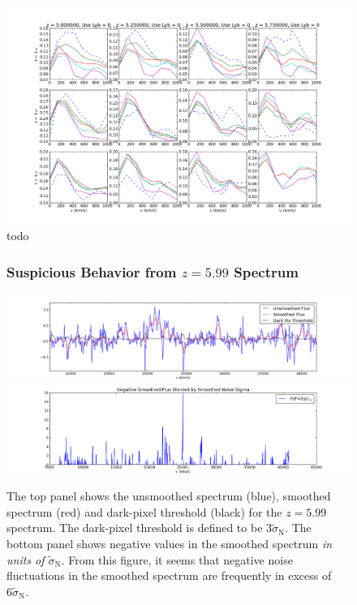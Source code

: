 \documentclass[11pt]{article}
\begin{document}
\begin{figure}[h]
  \centering
  \includegraphics[width=18cm]{gridPlot_CommonRes_AllSpectra.png}
  \caption{todo}
  \label{fig:todo}
\end{figure}

\begin{figure}[h]
\subsubsection*{Suspicious Behavior from $z = 5.99$ Spectrum}
  \centering
  \includegraphics[width=18cm]{z599_Spectra.png}
  \includegraphics[width=18cm]{z599_NoiseSignificance.png}
  \caption{The top panel shows the unsmoothed spectrum (blue), smoothed spectrum (red) and dark-pixel threshold (black) for the $z = 5.99$ spectrum. The dark-pixel threshold is defined to be $3\tilde{\sigma}_{\text{N}}$. The bottom panel shows negative values in the smoothed spectrum \textit{in units of $\tilde{\sigma}_{\text{N}}$}. From this figure, it seems that negative noise fluctuations in the smoothed spectrum are frequently in excess of $6\tilde{\sigma}_{\text{N}}$.}
  \label{fig:z599}
\end{figure}
\end{document}
